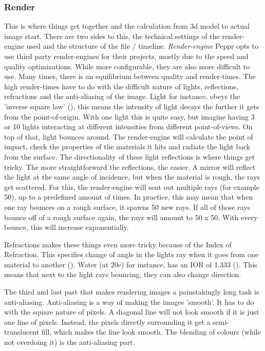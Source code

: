 \subsubsection{Render}
\label{sec:render}
This is where things get together and the calculation from 3d model to actual image start. There are two sides to this, the technical settings of the render-engine used and the structure of the file / timeline.
\newline
\textit{Render-engine}
\newline
Peppr opts to use third party render-engines for their projects, mostly due to the speed and quality optimizations. While more configurable, they are also more difficult to use. Many times, there is an equilibrium between quality and render-times. The high render-times have to do with the difficult nature of lights, reflections, refractions and the anti-aliasing of the image. Light for instance, obeys the 'inverse square law' (\cite{inverseLightLaw}), this means the intensity of light decays the further it gets from the point-of-origin. With one light this is quite easy, but imagine having 3 or 10 lights interacting at different intensities from different point-of-views. On top of that, light bounces around. The render-engine will calculate the point of impact, check the properties of the materials it hits and radiate the light back from the surface. The directionality of these light reflections is where things get tricky. The more straightforward the reflections, the easier. A mirror will reflect the light at the same angle of incidence, but when the material is rough, the rays get scattered. For this, the render-engine will sent out multiple rays (for example 50), up to a predefined amount of times. In practice, this may mean that when one ray bounces on a rough surface, it spawns 50 new rays. If all of those rays bounce off of a rough surface again, the rays will amount to 50 x 50. With every bounce, this will increase exponentially.

Refractions makes these things even more tricky because of the Index of Refraction. This specifies change of angle in the lights ray when it goes from one material to another (\cite{refractiveIndex}). Water (at 20c) for instance, has an IOR of 1.333 (\cite{waterIOR}). This means that next to the light rays bouncing, they can also change direction.

The third and last part that makes rendering images a painstakingly long task is anti-aliasing. Anti-aliasing is a way of making the images 'smooth'. It has to do with the square nature of pixels. A diagonal line will not look smooth if it is just one line of pixels. Instead, the pixels directly surrounding it get a semi-translucent fill, which makes the line look smooth. The blending of colours (while not overdoing it) is the anti-aliasing part.

